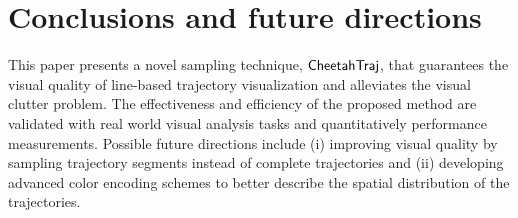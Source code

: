 \section{Conclusions and future directions}\label{sec:con}
This paper presents a novel sampling technique, $\mathsf{CheetahTraj}$, that guarantees the visual quality of line-based trajectory visualization and alleviates the visual clutter problem. The effectiveness and efficiency of the proposed method are validated with real world visual analysis tasks and quantitatively performance measurements. Possible future directions include (i) improving visual quality by sampling trajectory segments instead of complete trajectories and (ii) developing advanced color encoding schemes to better describe the spatial distribution of the trajectories.


